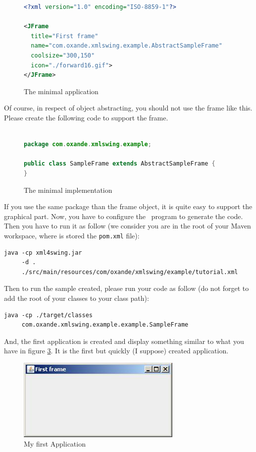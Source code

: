 \begin{figure}[htb]
\begin{lstlisting}[language=XML]
<?xml version="1.0" encoding="ISO-8859-1"?>

<JFrame 
  title="First frame" 
  name="com.oxande.xmlswing.example.AbstractSampleFrame"
  coolsize="300,150"
  icon="./forward16.gif">
</JFrame>

\end{lstlisting}
\caption{The minimal application}\label{fig:first-jframe}
\end{figure}

Of course, in respect of object abstracting, you should not use
the frame like this. Please create the following code to support
the frame.

\begin{figure}[htb]
\begin{lstlisting}[language=java]

package com.oxande.xmlswing.example;

public class SampleFrame extends AbstractSampleFrame {
}

\end{lstlisting}
\caption{The minimal implementation}\label{fig:first-java}
\end{figure}

If you use the same package than the frame object, it is
quite easy to support the graphical part. Now, you have to configure 
the \xmlswing\ program to generate the code. Then you have to
run it as follow (we consider you are in the root of your Maven 
workspace, where is stored the \verb|pom.xml| file):


\small
\begin{verbatim}
java -cp xml4swing.jar
     -d . 
     ./src/main/resources/com/oxande/xmlswing/example/tutorial.xml
\end{verbatim}
\normalsize

Then to run the sample created, please run your code as follow
(do not forget to add the root of your classes to your class path):
\small
\begin{verbatim}
java -cp ./target/classes
     com.oxande.xmlswing.example.example.SampleFrame
\end{verbatim}
\normalsize

And, the first application is created and display something
similar to what you have in figure \ref{fig:tuto-1}. It is the
first but quickly (I suppose) created application.


\begin{figure}[htb]
\begin{center}
\includegraphics[width=0.5\linewidth]{tuto-1.jpg}
\end{center}
\caption{My first Application\label{fig:tuto-1}}
\end{figure}

